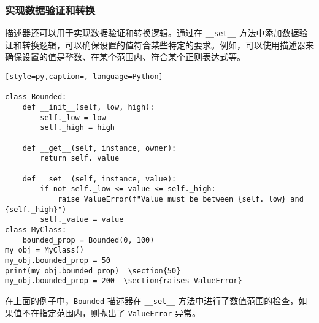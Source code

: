 \subsubsection{实现数据验证和转换}
描述器还可以用于实现数据验证和转换逻辑。通过在 \verb|__set__| 方法中添加数据验证和转换逻辑，可以确保设置的值符合某些特定的要求。例如，可以使用描述器来确保设置的值是整数、在某个范围内、符合某个正则表达式等。
\begin{lstlisting}[style=py,caption=, language=Python]

class Bounded:
    def __init__(self, low, high):
        self._low = low
        self._high = high
    
    def __get__(self, instance, owner):
        return self._value
    
    def __set__(self, instance, value):
        if not self._low <= value <= self._high:
            raise ValueError(f"Value must be between {self._low} and {self._high}")
        self._value = value
class MyClass:
    bounded_prop = Bounded(0, 100)
my_obj = MyClass()
my_obj.bounded_prop = 50
print(my_obj.bounded_prop)  \section{50}
my_obj.bounded_prop = 200  \section{raises ValueError}
\end{lstlisting}
在上面的例子中，\verb|Bounded| 描述器在 \verb|__set__| 方法中进行了数值范围的检查，如果值不在指定范围内，则抛出了 \verb|ValueError| 异常。
